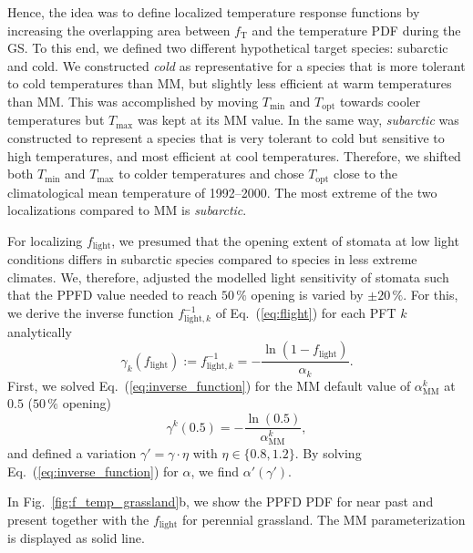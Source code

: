 \documentclass[bg, manuscript]{copernicus}
\begin{document}
Hence, the idea was to define localized temperature response functions by increasing the overlapping area between $f_\mathrm{T}$ and the temperature PDF during the GS. To this end, we defined two different hypothetical target species: subarctic and cold. We constructed \emph{cold} as representative for a species that is more tolerant to cold temperatures than MM, but slightly less efficient at warm temperatures than MM. This was accomplished by moving $T_\mathrm{min}$ and $T_\mathrm{opt}$ towards cooler temperatures but $T_\mathrm{max}$ was kept at its MM value. In the same way, \emph{subarctic} was constructed to represent a species that is very tolerant to cold but sensitive to high temperatures, and most efficient at cool temperatures. Therefore, we shifted both $T_\mathrm{min}$ and $T_\mathrm{max}$ to colder temperatures and chose $T_\mathrm{opt}$ close to the climatological mean temperature of 1992--2000. The most extreme of the two localizations compared to MM is \emph{subarctic}.

For localizing $f_\mathrm{light}$, we presumed that the opening extent of stomata at low light conditions differs in subarctic species compared to species in less extreme climates. We, therefore, adjusted the modelled light sensitivity of stomata such that the PPFD value needed to reach $50\,\unit{\%}$ opening is varied by $\pm 20\,\unit{\%}$. For this, we derive the inverse function $f_{\mathrm{light},k}^{-1}$ of Eq.~(\ref{eq:flight}) for each PFT $k$ analytically
%
\begin{equation}
  \gamma_k(f_\mathrm{light}) := f_{\mathrm{light}, k}^{-1} = -\frac{\ln(1-f_\mathrm{light})}{\alpha_k}.
  \label{eq:inverse_function}
\end{equation}
%
First, we solved Eq.~(\ref{eq:inverse_function}) for the MM default value of $\alpha_\mathrm{MM}^k$ at $0.5$ ($50\,\%$ opening)
\begin{equation}
  \gamma^k(0.5) = -\frac{\ln(0.5)}{\alpha_\mathrm{MM}^k},
  \label{eq:inverse_function_halfway}
\end{equation}
and defined a variation $\gamma' = \gamma \cdot \eta$ with $\eta \in \{0.8, 1.2\}$. By solving Eq.~(\ref{eq:inverse_function}) for $\alpha$, we find $\alpha'(\gamma')$. 

In Fig.~\ref{fig:f_temp_grassland}b, we show the PPFD PDF for near past and present together with the $f_\mathrm{light}$ for perennial grassland. The MM parameterization is displayed as solid line. 
\end{document}
